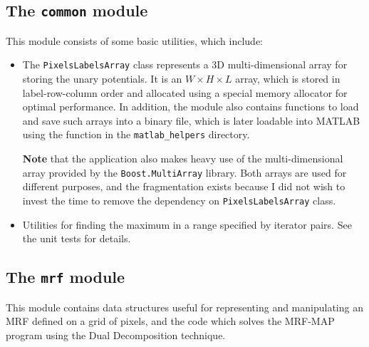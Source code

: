 \documentclass[12pt,a4paper]{article}
\begin{document}
\subsection{The \texttt{common} module}
This module consists of some basic utilities, which include:
\begin{itemize}
	\item The \texttt{PixelsLabelsArray} class represents a 3D multi-dimensional array for storing the unary potentials. It is an $W \times H \times L$ array, which is stored in label-row-column order and allocated using a special memory allocator for optimal performance. In addition, the module also contains functions to load and save such arrays into a binary file, which is later loadable into MATLAB using the function in the \texttt{matlab\_helpers} directory.
	
	\textbf{Note} that the application also makes heavy use of the multi-dimensional array provided by the \texttt{Boost.MultiArray} library. Both arrays are used for different purposes, and the fragmentation exists because I did not wish to invest the time to remove the dependency on \texttt{PixelsLabelsArray} class.
	\item Utilities for finding the maximum in a range specified by iterator pairs. See the unit tests for details.
\end{itemize}

\subsection{The \texttt{mrf} module}
This module contains data structures useful for representing and manipulating an MRF defined on a grid of pixels, and the code which solves the MRF-MAP program using the Dual Decomposition technique.
\end{document}
